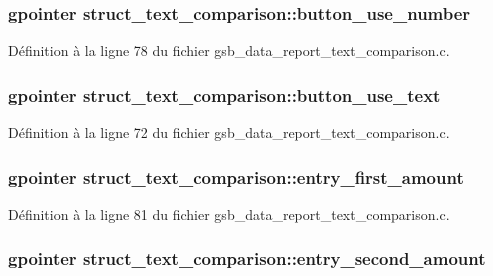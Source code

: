 \subsubsection[{button\_\-use\_\-number}]{\setlength{\rightskip}{0pt plus 5cm}gpointer {\bf struct\_\-text\_\-comparison::button\_\-use\_\-number}}\label{structstruct__text__comparison_a7ad10bb7a9a6d932fad7b0f121e647b0}


Définition à la ligne 78 du fichier gsb\_\-data\_\-report\_\-text\_\-comparison.c.

\subsubsection[{button\_\-use\_\-text}]{\setlength{\rightskip}{0pt plus 5cm}gpointer {\bf struct\_\-text\_\-comparison::button\_\-use\_\-text}}\label{structstruct__text__comparison_aff475f923aa66c1a66df5cb4043357e4}


Définition à la ligne 72 du fichier gsb\_\-data\_\-report\_\-text\_\-comparison.c.

\subsubsection[{entry\_\-first\_\-amount}]{\setlength{\rightskip}{0pt plus 5cm}gpointer {\bf struct\_\-text\_\-comparison::entry\_\-first\_\-amount}}\label{structstruct__text__comparison_a7566ae3cf14d2a7a60ce05bc88b6c488}


Définition à la ligne 81 du fichier gsb\_\-data\_\-report\_\-text\_\-comparison.c.

\subsubsection[{entry\_\-second\_\-amount}]{\setlength{\rightskip}{0pt plus 5cm}gpointer {\bf struct\_\-text\_\-comparison::entry\_\-second\_\-amount}}\label{structstruct__text__comparison_a1609716272ad2f0605228b5a3a9eacde}


